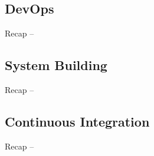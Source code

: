
\subsection{DevOps}
\begin{frame}{Recap -- \insertsubsection \mytitlesource{\handbuch}}
	\frameDevOps
\end{frame}

\begin{frame}{\insertsubsection}
	\centering{}
\end{frame}

\subsection{System Building}
\begin{frame}{Recap -- \insertsubsection \mytitlesource{\sommerville}}
	\frameSystemBuilding
\end{frame}

\subsection{Continuous Integration}
\begin{frame}{Recap -- \insertsubsection \mytitlesource{\sommerville}}
	\frameContinousIntegration
\end{frame}


